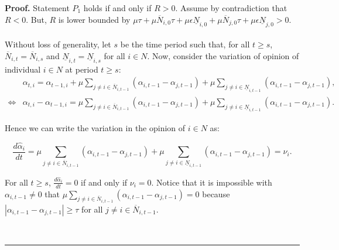 \documentclass{article}
\newenvironment{proof}[1][Proof]{\textbf{#1.} }{\ \rule{0.5em}{0.5em}}
\begin{document}
\begin{proof}
\noindent Statement $P_1$ holds if and only if $R>0$. Assume by contradiction that $R<0$. But, $R$ is lower bounded by $ \mu \tau + \mu \overline{N}_{i,0} \tau + \mu \epsilon \underline{N}_{i,0} + \mu \overline{N}_{j,0} \tau + \mu \epsilon \underline{N}_{j,0} > 0$.  \\ 

 \\

\noindent Without loss of generality, let $s$ be the time period such that, for all $t \geq s$, $\overline{N}_{i,t} = \overline{N}_{i,s}$ and $\underline{N}_{i,t} = \underline{N}_{i,s}$ for all $i \in N$. Now, consider the variation of opinion of individual $i \in N$ at period $t \geq s$: 
\begin{align*}
& \alpha_{t,i} = \alpha_{t-1,i} + \mu \sum \limits_{j \neq i \in \overline{N}_{i,t-1}} ( \alpha_{i,t-1} - \alpha_{j,t-1}) + \mu \sum \limits_{j \neq i \in \underline{N}_{i,t-1}} ( \alpha_{i,t-1} - \alpha_{j,t-1}), \\
\Leftrightarrow  &  \alpha_{t,i} -\alpha_{t-1,i} =   \mu \sum \limits_{j \neq i \in \overline{N}_{i,t-1}} ( \alpha_{i,t-1} - \alpha_{j,t-1}) + \mu \sum \limits_{j \neq i \in \underline{N}_{i,t-1}} ( \alpha_{i,t-1} - \alpha_{j,t-1}).
\end{align*}

\noindent Hence we can write the variation in the opinion of $i \in N$ as: 

$$\frac{d \hat{\alpha}_i}{dt} =  \mu \sum \limits_{j \neq i \in \overline{N}_{i,t-1}} ( \alpha_{i,t-1} - \alpha_{j,t-1}) + \mu \sum \limits_{j \neq i \in \underline{N}_{i,t-1}} ( \alpha_{i,t-1} - \alpha_{j,t-1}) = \nu_i.$$
 
\noindent For all $t \geq s$, $\frac{d \hat{\alpha}_i}{dt}=0$ if and only if $\nu_i = 0$. Notice that it is impossible with $\alpha_{i,t-1} \neq 0$ that $\mu \sum \limits_{j \neq i \in \overline{N}_{i,t-1}} ( \alpha_{i,t-1} - \alpha_{j,t-1}) =0$ because $| \alpha_{i,t-1} - \alpha_{j,t-1}| \geq \tau$ for all $ j \neq i \in \overline{N}_{i,t-1}$. 


\end{proof}
\end{document}
